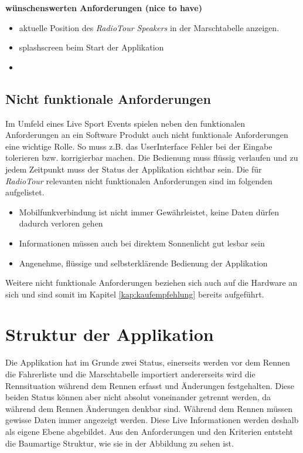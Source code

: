 \textbf{wünschenswerten Anforderungen (nice to have)}
\begin{itemize}
\item aktuelle Position des \textit{RadioTour Speakers} in der Marschtabelle anzeigen.
\item \gls{splashscreen} beim Start der Applikation
\item 
\end{itemize}

\subsection{Nicht funktionale Anforderungen}
Im Umfeld eines Live Sport Events spielen neben den funktionalen Anforderungen an ein Software Produkt auch nicht funktionale Anforderungen eine wichtige Rolle. So muss z.B. das UserInterface Fehler bei der Eingabe tolerieren bzw. korrigierbar machen. Die Bedienung muss flüssig verlaufen und zu jedem Zeitpunkt muss der Status der Applikation sichtbar sein. Die für \textit{RadioTour} relevanten nicht funktionalen Anforderungen sind im folgenden aufgelistet.

\begin{itemize}
\item Mobilfunkverbindung ist nicht immer Gewährleistet, keine Daten dürfen dadurch verloren gehen
\item Informationen müssen auch bei direktem Sonnenlicht gut lesbar sein
\item Angenehme, flüssige und selbsterklärende Bedienung der Applikation
\end{itemize}

Weitere nicht funktionale Anforderungen beziehen sich auch auf die Hardware an sich und sind somit im Kapitel \ref{kap:kaufempfehlung} bereits aufgeführt.

\section{Struktur der Applikation}
Die Applikation hat im Grunde zwei Status, einerseits werden vor dem Rennen die Fahrerliste und die Marschtabelle importiert andererseits wird die Rennsituation während dem Rennen erfasst und Änderungen festgehalten. Diese beiden Status können aber nicht absolut voneinander getrennt werden, da während dem Rennen Änderungen denkbar sind. Während dem Rennen müssen gewisse Daten immer angezeigt werden. Diese Live Informationen werden deshalb als eigene Ebene abgebildet. Aus den Anforderungen und den Kriterien entsteht die Baumartige Struktur, wie sie in der Abbildung zu sehen ist.


